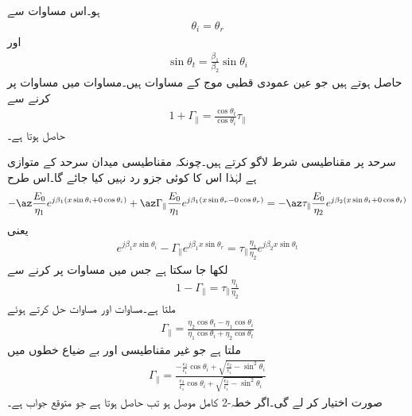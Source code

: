 ہو۔اس مساوات سے
\begin{align}
\theta_i=\theta_r
\end{align}
اور
\begin{align}
\sin \theta_t =\frac{\beta_1}{\beta_2} \sin \theta_i
\end{align}
حاصل ہوتے ہیں جو عین عمودی قطبی موج کے مساوات ہیں۔مساوات  میں مساوات  پر کرنے سے
\begin{align}\label{مساوات_ترچھی_متوازی_انعکاسی_انحرافی_تعلق_الف}
1   +  \Gamma_{\parallel} =\frac{\cos \theta_t}{\cos \theta_i} \tau_{\parallel} 
\end{align}
حاصل ہوتا ہے۔

سرحد پر مقناطیسی شرط لاگو کرتے ہیں۔چونکہ مقناطیسی میدان سرحد کے متوازی ہے لہٰذا اس کا کوئی جزو رد نہیں کیا جائے گا۔اس طرح
\begin{align*}
-\az \frac{E_0}{\eta_1} e^{j\beta_1 (x\sin \theta_i +0 \cos \theta_i)}+\az \Gamma_{\parallel} \frac{ E_0}{\eta_1} e^{j \beta_1 (x \sin \theta_r-0\cos \theta_r)}=-\az \tau_{\parallel} \frac{E_0}{\eta_2} e^{j \beta_2 (x \sin \theta_t+0\cos \theta_t)} 
\end{align*}
یعنی
\begin{align*}
 e^{j\beta_1 x\sin \theta_i}-\Gamma_{\parallel}  e^{j \beta_1 x \sin \theta_r}= \tau_{\parallel} \frac{\eta_1}{\eta_2} e^{j \beta_2 x \sin \theta_t} 
\end{align*}
لکھا جا سکتا ہے جس میں مساوات  پر کرنے سے
\begin{align}\label{مساوات_ترچھی_متوازی_انعکاسی_انحرافی_تعلق_ب}
1-\Gamma_{\parallel} = \tau_{\parallel} \frac{\eta_1}{\eta_2} 
\end{align}
ملتا ہے۔مساوات  اور مساوات  حل کرتے ہوئے
\begin{align}\label{مساوات_ترچھی_شرح_انعکاس_متوازی_موج_الف}
\Gamma_{\parallel} =\frac{\eta_2 \cos \theta_t -\eta_1 \cos \theta_i}{\eta_1 \cos \theta_i+\eta_2 \cos \theta_t}
\end{align}
ملتا ہے جو غیر مقناطیسی اور بے ضیاع خطوں میں
\begin{align}\label{مساوات_ترچھی_شرح_انعکاس_بلمقابل_زاویہ_آمد}
\Gamma_{\parallel} =\frac{-\frac{\epsilon_2}{\epsilon_1}\cos \theta_i+\sqrt{\frac{\epsilon_2}{\epsilon_1}-\sin^2 \theta_i}}{\frac{\epsilon_2}{\epsilon_1}\cos \theta_i+\sqrt{\frac{\epsilon_2}{\epsilon_1}-\sin^2 \theta_i}}
\end{align}
صورت اختیار کر لے گی۔اگر خطہ-2 کامل موصل ہو تب  حاصل ہوتا ہے جو متوقع جواب ہے۔ 

